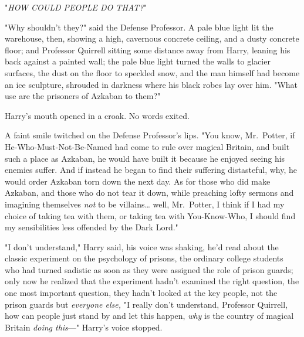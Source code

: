 "\emph{HOW COULD PEOPLE DO THAT?}"

"Why shouldn't they?" said the Defense Professor. A pale blue light lit the 
warehouse, then, showing a high, cavernous concrete ceiling, and a dusty 
concrete floor; and Professor Quirrell sitting some distance away from Harry, 
leaning his back against a painted wall; the pale blue light turned the walls 
to glacier surfaces, the dust on the floor to speckled snow, and the man 
himself had become an ice sculpture, shrouded in darkness where his black robes 
lay over him. "What use are the prisoners of Azkaban to them?"

Harry's mouth opened in a croak. No words exited.

A faint smile twitched on the Defense Professor's lips. "You know, Mr.~Potter, 
if He-Who-Must-Not-Be-Named had come to rule over magical Britain, and built 
such a place as Azkaban, he would have built it because he enjoyed seeing his 
enemies suffer. And if instead he began to find their suffering distasteful, 
why, he would order Azkaban torn down the next day. As for those who did make 
Azkaban, and those who do not tear it down, while preaching lofty sermons and 
imagining themselves \emph{not} to be villains{\ldots} well, Mr.~Potter, I 
think if I had my choice of taking tea with them, or taking tea with 
You-Know-Who, I should find my sensibilities less offended by the Dark Lord."

"I don't understand," Harry said, his voice was shaking, he'd read about the 
classic experiment on the psychology of prisons, the ordinary college students 
who had turned sadistic as soon as they were assigned the role of prison 
guards; only now he realized that the experiment hadn't examined the right 
question, the one most important question, they hadn't looked at the key 
people, not the prison guards but \emph{everyone else,} "I really don't 
understand, Professor Quirrell, how can people just stand by and let this 
happen, \emph{why} is the country of magical Britain \emph{doing this}---" 
Harry's voice stopped.

